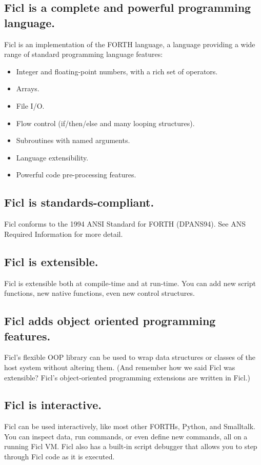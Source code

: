 \subsection{Ficl is a \textbf{complete and powerful programming language}.}
Ficl is an implementation of the FORTH language, a language providing a
wide range of standard programming language features:
\begin{itemize}[noitemsep]
	\item Integer and floating-point numbers, with a rich set of operators.
	\item Arrays.
	\item File I/O.
	\item Flow control (if/then/else and many looping structures).
	\item Subroutines with named arguments.
	\item Language extensibility.
	\item Powerful code pre-processing features.
\end{itemize}
\subsection{Ficl is \textbf{standards-compliant}.}
Ficl conforms to the 1994 ANSI Standard for FORTH (DPANS94). See ANS
Required Information for more detail.
\subsection{Ficl is \textbf{extensible}.}
Ficl is extensible both at compile-time and at run-time. You can add new
script functions, new native functions, even new control structures.
\subsection{Ficl adds \textbf{object oriented programming features}.}
Ficl's flexible OOP library can be used to wrap data structures or
classes of the host system without altering them. (And remember how we
said Ficl was extensible? Ficl's object-oriented programming extensions
are written in Ficl.)
\subsection{Ficl is \textbf{interactive}.}
Ficl can be used interactively, like most other FORTHs, Python, and
Smalltalk. You can inspect data, run commands, or even define new
commands, all on a running Ficl VM. Ficl also has a built-in script
debugger that allows you to step through Ficl code as it is executed.
